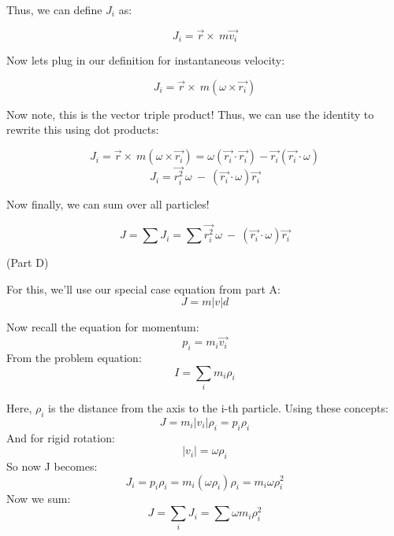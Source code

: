 \documentclass[12pt,letterpaper, onecolumn]{exam}
\begin{document}
\begin{questions}
\begin{solution}
        Thus, we can define $J_i$ as:

        \begin{equation}
            J_i=\vec{r}\times\ m\vec{v_i}
        \end{equation}

        Now lets plug in our definition for instantaneous velocity:

        \begin{equation}
            J_i=\vec{r}\times\ m(\omega\times\vec{r_i})
        \end{equation}

        Now note, this is the vector triple product! Thus, we can use the identity to rewrite this using dot products:

        \begin{equation}
            J_i=\vec{r}\times\ m(\omega\times\vec{r_i}) = \omega(\vec{r_i}\cdot\vec{r_i})-\vec{r_i}(\vec{r_i}\cdot\omega)
        \end{equation}
        \begin{equation}
            J_i=\vec{r_i^2}\,\omega\ -\ (\vec{r_i}\cdot\omega)\vec{r_i}
        \end{equation}

        Now finally, we can sum over all particles!

        \begin{equation}
            J = \sum J_i = \sum \vec{r_i^2}\,\omega\ -\ (\vec{r_i}\cdot\omega)\vec{r_i}
        \end{equation}

        (Part D)

        For this, we'll use our special case equation from part A:
        \begin{equation}
            J=m|v|d
        \end{equation}

        Now recall the equation for momentum:
         \begin{equation}
            p_i=m_i\vec{v_i}
        \end{equation}
        From the problem equation:
        \begin{equation}
            I = \sum_i m_i\rho_i
        \end{equation}

        Here, $\rho_i$ is the distance from the axis to the i-th particle.
        Using these concepts:
        \begin{equation}
            J=m_i|v_i|\rho_i = p_i\rho_i
        \end{equation}
        And for rigid rotation:
        \begin{equation}
            |v_i|=\omega\rho_i
        \end{equation}
        So now J becomes:
        \begin{equation}
            J_i = p_i\rho_i=m_i(\omega \rho_i)\rho_i = m_i\omega \rho_i^2
        \end{equation}
        Now we sum:
        \begin{equation}
            J = \sum_i J_i = \sum \omega m_i\rho_i^2
        \end{equation}


\end{solution}
\end{questions}
\end{document}
